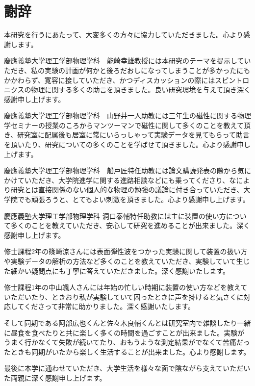 \documentclass[dvipdfmx,11pt]{jsreport}
\numberwithin{equation}{chapter}
\numberwithin{table}{chapter}
\begin{document}



\nocite{st,Peskin,spin_oxford,alma9926360528004034,alma990023076750204034,alma990023937250204034,ku,neko,shi,alma990008478350204034,hikansei}

\chapter*{謝辞}
本研究を行うにあたって、大変多くの方々に協力していただきました。心より感謝します。

慶應義塾大学理工学部物理学科　能崎幸雄教授には本研究のテーマを提示していただき、私の実験の計画が何かと後ろだおしになってしまうことが多かったにもかかわらず、寛容に接していただき、かつディスカッションの際にはスピントロニクスの物理に関する多くの助言を頂きました。良い研究環境を与えて頂き深く感謝申し上げます。

慶應義塾大学理工学部物理学科　山野井一人助教には三年生の磁性に関する物理学セミナーの授業のころからマンツーマンで磁性に関して多くのことを教えて頂き、研究室に配属後も居室に常にいらっしゃって実験データを見てもらって助言を頂いたり、研究についての多くのことを学ばせて頂きました。心より感謝申し上げます。

慶應義塾大学理工学部物理学科　船戸匠特任助教には論文購読発表の際から気にかけていただき、大学院進学に関する進路相談などにも乗ってくださり、なにより研究とは直接関係のない個人的な物理の勉強の議論に付き合っていただき、大学院でも頑張ろうと、とてもよい刺激を頂きました。心より感謝申し上げます。

慶應義塾大学理工学部物理学科 洞口泰輔特任助教には主に装置の使い方について多くのことを教えていただき、安心して研究を進めることが出来ました。深く感謝申し上げます。

修士課程2年の篠崎涼さんには表面弾性波をつかった実験に関して装置の扱い方や実験データの解析の方法など多くのことを教えていただき、実験していて生じた細かい疑問点にも丁寧に答えていただきました。深く感謝いたします。

修士課程1年の中山颯人さんには年始の忙しい時期に装置の使い方などを教えていただいたり、ときおり私が実験していて困ったときに声を掛けると気さくに対応してくださって非常に助かりました。深く感謝いたします。

そして同期である阿部広也くんと佐々木良輔くんとは研究室内で雑談したり一緒に昼食を食べたりと共に楽しく多くの時間を過ごすことが出来ました。実験がうまく行かなくて失敗が続いてたり、おもうような測定結果がでなくて苦痛だったときも同期がいたから楽しく生活することが出来ました。心より感謝します。

最後に本学に通わせていただき、大学生活を様々な面で陰ながら支えていただいた両親に深く感謝申し上げます。
\end{document}

